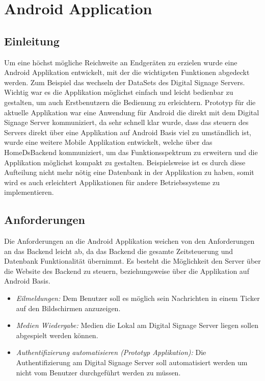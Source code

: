 \chapter{Android Application}
\section{Einleitung}
Um eine höchst mögliche Reichweite an Endgeräten zu erzielen wurde eine Android Applikation entwickelt, mit der die wichtigsten Funktionen abgedeckt werden. Zum Beispiel das wechseln der DataSets des Digital Signage Servers. Wichtig war es die Applikation möglichst einfach und leicht bedienbar zu gestalten, um auch Erstbenutzern die Bedienung zu erleichtern. 
Prototyp für die aktuelle Applikation war eine Anwendung für Android die direkt mit dem Digital Signage Server kommuniziert, da sehr schnell klar wurde, dass das steuern des Servers direkt über eine Applikation auf Android Basis viel zu umständlich ist, wurde eine weitere Mobile Applikation entwickelt, welche über das HomeDsBackend kommuniziert, um das Funktionsspektrum zu erweitern und die Applikation möglichst kompakt zu gestalten. Beispielsweise ist es durch diese Aufteilung nicht mehr nötig eine Datenbank in der Applikation zu haben, somit wird es auch erleichtert Applikationen für andere Betriebssysteme zu implementieren. 


\section{Anforderungen}
Die Anforderungen an die Android Applikation weichen von den Anforderungen an das Backend leicht ab, da das Backend die gesamte Zeitsteuerung und Datenbank Funktionalität übernimmt. Es besteht die Möglichkeit den Server über die Website des Backend zu steuern, beziehungsweise über die Applikation auf Android Basis. 

\begin{itemize}
	\item {\em Eilmeldungen:} Dem Benutzer soll es möglich sein Nachrichten in einem Ticker auf den Bildschirmen anzuzeigen.
	
	\item {\em Medien Wiedergabe:} Medien die Lokal am Digital Signage Server liegen sollen abgespielt werden können.
		
	\item {\em Authentifizierung automatisieren (Prototyp Applikation):} Die Authentifizierung am Digital Signage Server soll automatisiert werden um nicht vom Benutzer durchgeführt werden zu müssen.  
		
\end{itemize}

